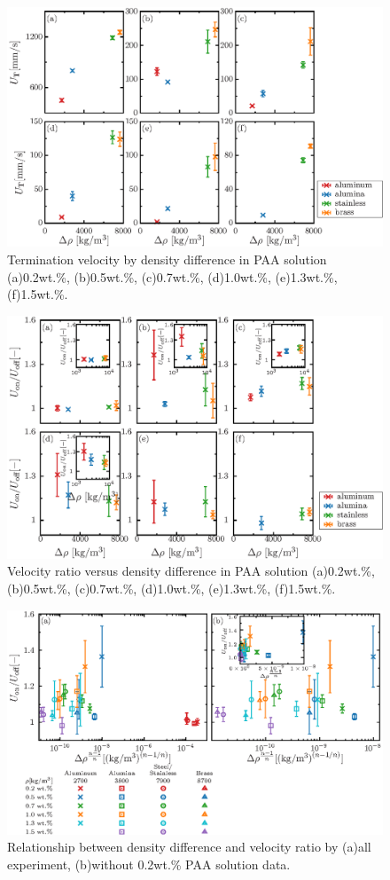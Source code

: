 \begin{figure}[ht]
    \centering
    \includegraphics[width=1.0\textwidth]{./5-Results/rhoUT.eps}
    \caption{Termination velocity by density difference in PAA solution (a)0.2wt.\%, (b)0.5wt.\%, (c)0.7wt.\%, (d)1.0wt.\%, (e)1.3wt.\%, (f)1.5wt.\%.}
    \label{fig:rhoUT}
\end{figure}

\begin{figure}[ht]
    \centering
    \includegraphics[width=1.0\textwidth]{./5-Results/rhoUdiff.eps}
    \caption{Velocity ratio versus density difference in PAA solution (a)0.2wt.\%, (b)0.5wt.\%, (c)0.7wt.\%, (d)1.0wt.\%, (e)1.3wt.\%, (f)1.5wt.\%.}
    \label{fig:rhoUdiff}
\end{figure}

\begin{figure}[ht]
    \centering
    \includegraphics[width=1.0\textwidth]{./5-Results/rhoUdiffAll.eps}
    \caption{Relationship between density difference and velocity ratio by (a)all experiment, (b)without 0.2wt.\% PAA solution data.}
    \label{fig:rhoUdiffAll}
\end{figure}